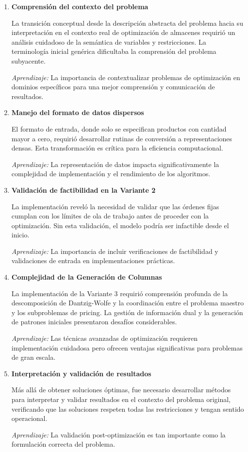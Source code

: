 \documentclass[a4paper,12pt]{article}
\begin{document}
\begin{enumerate}
    \item \textbf{Comprensión del contexto del problema}
    
    La transición conceptual desde la descripción abstracta del problema hacia su interpretación en el contexto real de optimización de almacenes requirió un análisis cuidadoso de la semántica de variables y restricciones. La terminología inicial genérica dificultaba la comprensión del problema subyacente.
    
    \emph{Aprendizaje:} La importancia de contextualizar problemas de optimización en dominios específicos para una mejor comprensión y comunicación de resultados.

    \item \textbf{Manejo del formato de datos dispersos}
    
    El formato de entrada, donde solo se especifican productos con cantidad mayor a cero, requirió desarrollar rutinas de conversión a representaciones densas. Esta transformación es crítica para la eficiencia computacional.
    
    \emph{Aprendizaje:} La representación de datos impacta significativamente la complejidad de implementación y el rendimiento de los algoritmos.

    \item \textbf{Validación de factibilidad en la Variante 2}
    
    La implementación reveló la necesidad de validar que las órdenes fijas cumplan con los límites de ola de trabajo antes de proceder con la optimización. Sin esta validación, el modelo podría ser infactible desde el inicio.
    
    \emph{Aprendizaje:} La importancia de incluir verificaciones de factibilidad y validaciones de entrada en implementaciones prácticas.

    \item \textbf{Complejidad de la Generación de Columnas}
    
    La implementación de la Variante 3 requirió comprensión profunda de la descomposición de Dantzig-Wolfe y la coordinación entre el problema maestro y los subproblemas de pricing. La gestión de información dual y la generación de patrones iniciales presentaron desafíos considerables.
    
    \emph{Aprendizaje:} Las técnicas avanzadas de optimización requieren implementación cuidadosa pero ofrecen ventajas significativas para problemas de gran escala.

    \item \textbf{Interpretación y validación de resultados}
    
    Más allá de obtener soluciones óptimas, fue necesario desarrollar métodos para interpretar y validar resultados en el contexto del problema original, verificando que las soluciones respeten todas las restricciones y tengan sentido operacional.
    
    \emph{Aprendizaje:} La validación post-optimización es tan importante como la formulación correcta del problema.
\end{enumerate}
\end{document}
